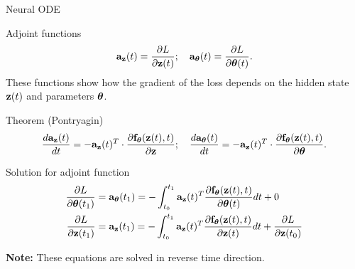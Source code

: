\begin{frame}{Neural ODE}
	\vspace{-0.2cm}
	\begin{block}{Adjoint functions}
		\vspace{-0.4cm}
		\[
			\mathbf{a}_{\mathbf{z}}(t) = \frac{\partial L}{\partial \mathbf{z}(t)}; \quad \mathbf{a}_{\boldsymbol{\theta}}(t) = \frac{\partial L}{\partial \boldsymbol{\theta}(t)}.
		\]
		These functions show how the gradient of the loss depends on the hidden state~$\mathbf{z}(t)$ and parameters $\boldsymbol{\theta}$.
		\vspace{-0.3cm}
	\end{block}

	\begin{block}{Theorem (Pontryagin)}
		\vspace{-0.6cm}
		\[
		\frac{d \mathbf{a}_{\mathbf{z}}(t)}{dt} = - \mathbf{a}_{\mathbf{z}}(t)^T \cdot \frac{\partial \mathbf{f}_{\boldsymbol{\theta}}(\mathbf{z}(t), t)}{\partial \mathbf{z}}; \quad \frac{d \mathbf{a}_{\boldsymbol{\theta}}(t)}{dt} = - \mathbf{a}_{\mathbf{z}}(t)^T \cdot \frac{\partial \mathbf{f}_{\boldsymbol{\theta}}(\mathbf{z}(t),  t)}{\partial \boldsymbol{\theta}}.
		\]
		\vspace{-0.7cm}
	\end{block}
	\begin{block}{Solution for adjoint function}
		\vspace{-0.6cm}
		{\small
		\begin{align*}
			\frac{\partial L}{\partial \boldsymbol{\theta}(t_1)} &= \mathbf{a}_{\boldsymbol{\theta}}(t_1) =  - \int_{t_0}^{t_1} \mathbf{a}_{\mathbf{z}}(t)^T \frac{\partial \mathbf{f}_{\boldsymbol{\theta}}(\mathbf{z}(t), t)}{\partial \boldsymbol{\theta}(t)} dt + 0\\
			\frac{\partial L}{\partial \mathbf{z}(t_1)} &= \mathbf{a}_{\mathbf{z}}(t_1) =  - \int_{t_0}^{t_1} \mathbf{a}_{\mathbf{z}}(t)^T \frac{\partial \mathbf{f}_{\boldsymbol{\theta}}(\mathbf{z}(t), t)}{\partial \mathbf{z}(t)} dt + \frac{\partial L}{\partial \mathbf{z}(t_0)}\\
		\end{align*}
		}
		\vspace{-1.3cm}
	\end{block}
	\textbf{Note:} These equations are solved in reverse time direction.
\end{frame}
